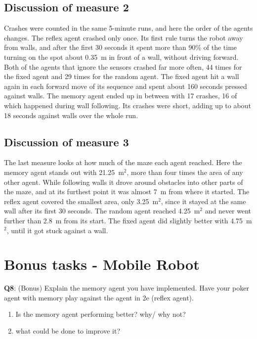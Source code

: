 \documentclass{article}
\begin{document}
\subsection*{Discussion of measure 2}

Crashes were counted in the same 5-minute runs, and here the order of the agents changes. The reflex agent crashed only once. Its first rule turns the robot away from walls, and after the first 30 seconds it spent more than 90\% of the time turning on the spot about 0.35~m in front of a wall, without driving forward. Both of the agents that ignore the sensors crashed far more often, 44 times for the fixed agent and 29 times for the random agent. The fixed agent hit a wall again in each forward move of its sequence and spent about 160 seconds pressed against walls. The memory agent ended up in between with 17 crashes, 16 of which happened during wall following. Its crashes were short, adding up to about 18 seconds against walls over the whole run.

\subsection*{Discussion of measure 3}

The last measure looks at how much of the maze each agent reached. Here the memory agent stands out with 21.25~m$^2$, more than four times the area of any other agent. While following walls it drove around obstacles into other parts of the maze, and at its furthest point it was almost 7~m from where it started. The reflex agent covered the smallest area, only 3.25~m$^2$, since it stayed at the same wall after its first 30 seconds. The random agent reached 4.25~m$^2$ and never went further than 2.8~m from its start. The fixed agent did slightly better with 4.75~m$^2$, until it got stuck against a wall.


\section*{Bonus tasks - Mobile Robot}

\begin{tcolorbox}
\textbf{Q8}: (Bonus) Explain the memory agent you have implemented. Have your poker agent with memory play against the agent in 2e (reflex agent).  
        
        \begin{enumerate}
            \item Is the memory agent performing better? why/ why not?
            \item what could be done to improve it?
        \end{enumerate}
\end{tcolorbox}
\end{document}
